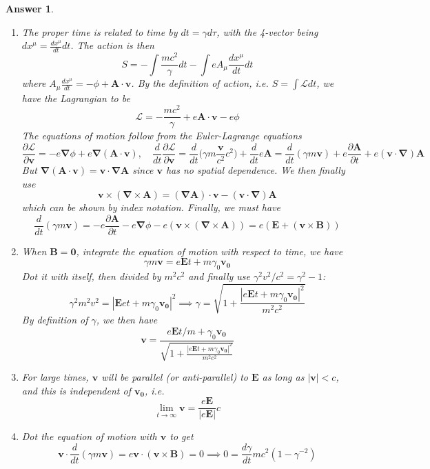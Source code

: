 \documentclass[a4paper]{article}
\newtheorem{ans}{Answer}[section]
\theoremstyle{new}
\begin{document}
\begin{ans}\leavevmode
\begin{enumerate}[label=(\alph*)]
\item The proper time is related to time by $dt=\gamma d\tau$, with the 4-vector being $dx^\mu=\frac{dx^\mu}{dt}dt$. The action is then
$$S=-\int\frac{mc^2}{\gamma}dt-\int eA_\mu\frac{dx^\mu}{dt}dt$$
where $A_\mu\frac{dx^\mu}{dt}=-\phi+\mathbf{A}\cdot\mathbf{v}$. By the definition of action, i.e. $S=\int\mathcal{L}dt$, we have the Lagrangian to be
$$\mathcal{L}=-\frac{mc^2}{\gamma}+e\mathbf{A}\cdot\mathbf{v}-e\phi$$
The equations of motion follow from the Euler-Lagrange equations
$$\frac{\partial\mathcal{L}}{\partial\mathbf{v}}=-e\boldsymbol{\nabla}\phi+e\boldsymbol{\nabla}(\mathbf{A}\cdot\mathbf{v}),\quad\frac{d}{dt}\frac{\partial\mathcal{L}}{\partial\mathbf{v}}=\frac{d}{dt}\bigg(\gamma m\frac{\mathbf{v}}{c^2}c^2\bigg)+\frac{d}{dt}e\mathbf{A}=\frac{d}{dt}(\gamma m\mathbf{v})+e\frac{\partial\mathbf{A}}{\partial t}+e(\mathbf{v}\cdot\boldsymbol{\nabla})\mathbf{A}$$
But $\boldsymbol{\nabla}(\mathbf{A}\cdot\mathbf{v})=\mathbf{v}\cdot\boldsymbol{\nabla}\mathbf{A}$ since $\mathbf{v}$ has no spatial dependence. We then finally use
$$\mathbf{v}\times(\boldsymbol{\nabla}\times\mathbf{A})=(\boldsymbol{\nabla}\mathbf{A})\cdot\mathbf{v}-(\mathbf{v}\cdot\boldsymbol{\nabla})\mathbf{A}$$
which can be shown by index notation. Finally, we must have
$$\frac{d}{dt}(\gamma m\mathbf{v})=-e\frac{\partial\mathbf{A}}{\partial t}-e\boldsymbol{\nabla}\phi-e(\mathbf{v}\times(\boldsymbol{\nabla}\times\mathbf{A}))=e(\mathbf{E}+(\mathbf{v}\times\mathbf{B}))$$
\item When $\mathbf{B}=\boldsymbol{0}$, integrate the equation of motion with respect to time, we have
$$\gamma m\mathbf{v}=e\mathbf{E}t+m\gamma_0\mathbf{v_0}$$
Dot it with itself, then divided by $m^2c^2$ and finally use $\gamma^2v^2/c^2=\gamma^2-1$:
$$\gamma^2m^2v^2=|\mathbf{E}et+m\gamma_0\mathbf{v_0}|^2\implies\gamma=\sqrt{1+\frac{|e\mathbf{E}t+m\gamma_0\mathbf{v_0}|^2}{m^2c^2}}$$
By definition of $\gamma$, we then have
$$\mathbf{v}=\frac{e\mathbf{E}t/m+\gamma_0\mathbf{v_0}}{\sqrt{1+\frac{|e\mathbf{E}t+m\gamma_0\mathbf{v_0}|^2}{m^2c^2}}}$$
\item For large times, $\mathbf{v}$ will be parallel (or anti-parallel) to $\mathbf{E}$ as long as $|\mathbf{v}|<c$, and this is independent of $\mathbf{v_0}$, i.e.
$$\lim_{t\rightarrow\infty}\mathbf{v}=\frac{e\mathbf{E}}{|e\mathbf{E}|}c$$
\item Dot the equation of motion with $\mathbf{v}$ to get
$$\mathbf{v}\cdot\frac{d}{dt}(\gamma m\mathbf{v})=e\mathbf{v}\cdot(\mathbf{v}\times\mathbf{B})=0\implies 0=\frac{d\gamma}{dt}mc^2(1-\gamma^{-2})$$

\end{enumerate}
\end{ans}
\end{document}
